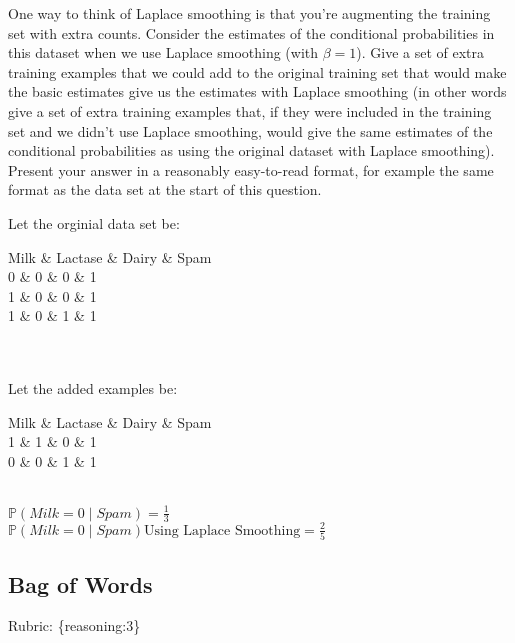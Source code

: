 \documentclass{article}
\def\rubric#1{\gre{Rubric: \{#1\}}}{}
\def\blu#1{{\color{blu}#1}}
\def\gre#1{{\color{gre}#1}}
\def\red#1{{\color{red}#1}}
\def\cond{\; | \;}
\begin{document}
One way to think of Laplace smoothing is that you're augmenting the training set with extra counts. Consider the estimates of the conditional probabilities in this dataset when we use Laplace smoothing (with $\beta = 1$). 
\blu{Give a set of extra training examples that we could add to the original training set that would make the basic estimates give us the estimates with Laplace smoothing} (in other words give a set of extra training examples that, if they were included in the training set and we didn't use Laplace smoothing, would give the same estimates of the conditional probabilities as using the original dataset with Laplace smoothing).
Present your answer in a reasonably easy-to-read format, for example the same format as the data set at the start of this question.\\
\red{Let the orginial data set be: \\\begin{bmatrix}Milk & Lactase & Dairy & Spam \\0 & 0 & 0 & 1 \\ 1 & 0 & 0 & 1 \\1 & 0 & 1 & 1 \\\end{bmatrix} \\
\\ Let the added examples be:\\ 
\begin{bmatrix}Milk & Lactase & Dairy & Spam \\1 & 1 & 0 & 1 \\0 & 0 & 1 & 1 \\\end{bmatrix} \\
$\mathbb{P}(Milk = 0 \cond Spam) = \frac{1}{3}$ \\
$\mathbb{P}(Milk = 0 \cond Spam) \mbox{Using Laplace Smoothing} = \frac{2}{5}$
}
\subsection{Bag of Words}
\rubric{reasoning:3}
\end{document}

